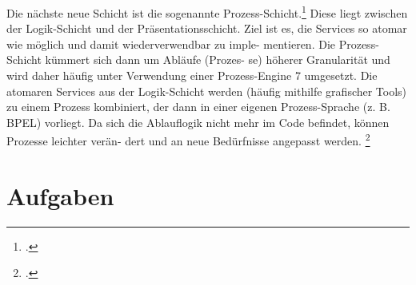 \documentclass{lehramt-informatik-haupt}
\begin{document}
Die nächste neue Schicht ist die sogenannte
Prozess-Schicht.\footcite[Seite 17]{sosy:fs:4} Diese liegt zwischen der
Logik-Schicht und der Präsentationsschicht. Ziel ist es, die Services so
atomar wie möglich und damit wiederverwendbar zu imple- mentieren. Die
Prozess-Schicht kümmert sich dann um Abläufe (Prozes- se) höherer
Granularität und wird daher häufig unter Verwendung einer Prozess-Engine
7 umgesetzt. Die atomaren Services aus der Logik-Schicht werden (häufig
mithilfe grafischer Tools) zu einem Prozess kombiniert, der dann in
einer eigenen Prozess-Sprache (z. B. BPEL) vorliegt. Da sich die
Ablauflogik nicht mehr im Code befindet, können Prozesse leichter verän-
dert und an neue Bedürfnisse angepasst werden.
\footcite[Seite 214-215]{schatten}


\chapter{Aufgaben}

\literatur
\end{document}
